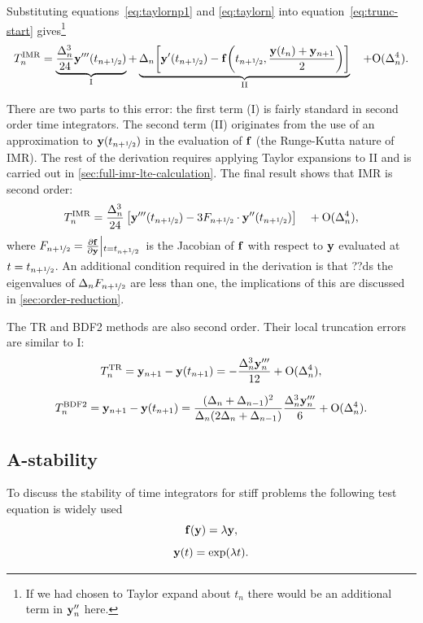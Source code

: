 Substituting equations~\eqref{eq:taylornp1} and \eqref{eq:taylorn} into equation~\eqref{eq:trunc-start} gives\footnote{If we had chosen to Taylor expand about $t_n$ there would be an additional term in $\mathbf{y}_n''$ here.}
\begin{equation}
  \lte^\imr = \underbrace{\frac{\dtn^3}{24} \yvhf[''']}_{\text{I}}
  + \underbrace{\dtn\bigs{ \yvhf['] - \ffv{\thf, \frac{\yv(t_n) + \yv_{n+1}}{2}} }}_{\text{II}}
  \porder{\dtn^4}.
  \label{eq:trunc-mid}
\end{equation}

There are two parts to this error: the first term (I) is fairly standard in second order time integrators.
The second term (II) originates from the use of an approximation to $\mathbf{y}(t_{n+\nicefrac{1}{2}})$ in the evaluation of ${\mathbf{f}}$ (\ie the Runge-Kutta nature of IMR).
The rest of the derivation requires applying Taylor expansions to II and is carried out in \autoref{sec:full-imr-lte-calculation}.
The final result shows that IMR is second order:
\begin{equation}
  \lte^\imr = \frac{\dtn^3}{24} \left[\yvhf['''] - 3 \dfdyhf \cdot \yvhf[''] \right]
  \porder{\dtn^4},
  \label{eq:trunc-final}
\end{equation}
where $F_{n+\nicefrac{1}{2}} = \frac{\partial {\mathbf{f}}}{\partial \mathbf{y}}{\left|_{t=t_{n+\nicefrac{1}{2}}}\right.}$ is the Jacobian of ${\mathbf{f}}$ with respect to $\mathbf{y}$ evaluated at $t=t_{n+\nicefrac{1}{2}}$.
An additional condition required in the derivation is that ??ds the eigenvalues of $\Delta_{n}F_{n+\nicefrac{1}{2}}$ are less than one, the implications of this are discussed in \autoref{sec:order-reduction}.

The TR\cite[pg. 261]{GreshoSani} and BDF2\cite[pg. 715]{GreshoSani} methods are also second order.
Their local truncation errors are similar to I:
\begin{equation}
  \label{eq:tr-lte}
  \lte^\tr = \yv_{n+1} - \yv(t_{n+1}) = -\frac{\dtn^3 \yv_n'''}{12}
  + \order{\dtn^4},
\end{equation}

\begin{equation}
  \label{eq:bdf2-lte}
  \lte^\bdf = \yv_{n+1} - \yv(t_{n+1}) = \frac{(\dtn + \dtx{n-1})^2}{\dtn(2\dtn + \dtx{n-1})}
  \frac{\dtn^3 \yv_n'''}{6}
  + \order{\dtn^4}.
\end{equation}


\subsection{A-stability}

To discuss the stability of time integrators for stiff problems the following test equation is widely used
\begin{equation}
  \ffv{\yv} = \lambda \yv,
  \label{eq:ode-test-f}
\end{equation}
\ie
\begin{equation}
  \mathbf{y}(t) = \exp(\lambda t).
\end{equation}

